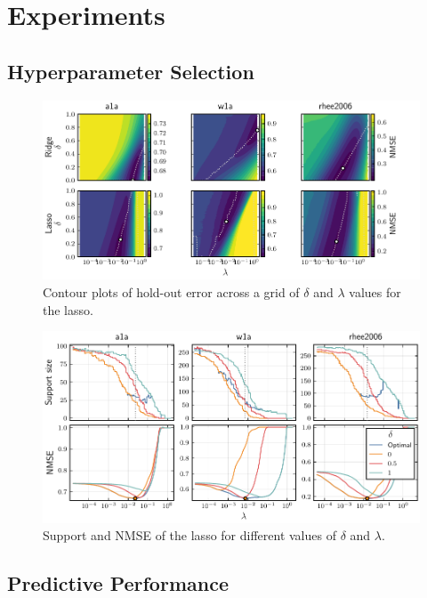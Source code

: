 \section{Experiments}
\label{sec:experiments}

\subsection{Hyperparameter Selection}

\begin{figure}[htpb]
  \centering
  \includegraphics[]{plots/hyperopt_surfaces.pdf}
  \caption{%
    Contour plots of hold-out error across a grid of \(\delta\) and \(\lambda\) values for the
    lasso.
  }
  \label{fig:hyperopt-contours}
\end{figure}

\begin{figure}[htpb]
  \centering
  \includegraphics[]{plots/hyperopt_paths.pdf}
  \caption{%
    Support and NMSE of the lasso for different values of \(\delta\) and \(\lambda\).
  }
  \label{fig:hyperopt-support}
\end{figure}

\subsection{Predictive Performance}

